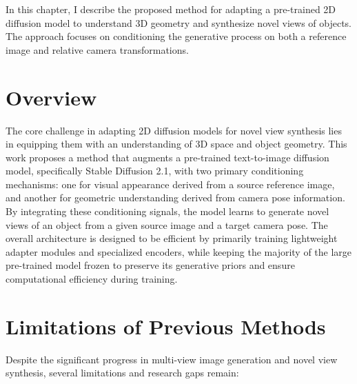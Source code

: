 \label{chapter:proposed-method}

In this chapter, I describe the proposed method for adapting a pre-trained 2D diffusion model to understand 3D geometry and synthesize novel views of objects. The approach focuses on conditioning the generative process on both a reference image and relative camera transformations.

\section{Overview}
The core challenge in adapting 2D diffusion models for novel view synthesis lies in equipping them with an understanding of 3D space and object geometry.
This work proposes a method that augments a pre-trained text-to-image diffusion model, specifically Stable Diffusion 2.1, with two primary conditioning mechanisms: one for visual appearance derived from a source reference image, and another for geometric understanding derived from camera pose information.
By integrating these conditioning signals, the model learns to generate novel views of an object from a given source image and a target camera pose.
The overall architecture is designed to be efficient by primarily training lightweight adapter modules and specialized encoders, while keeping the majority of the large pre-trained model frozen to preserve its generative priors and ensure computational efficiency during training.

\section{Limitations of Previous Methods}\label{sec:limitations}

Despite the significant progress in multi-view image generation and novel view synthesis, several limitations and research gaps remain:

